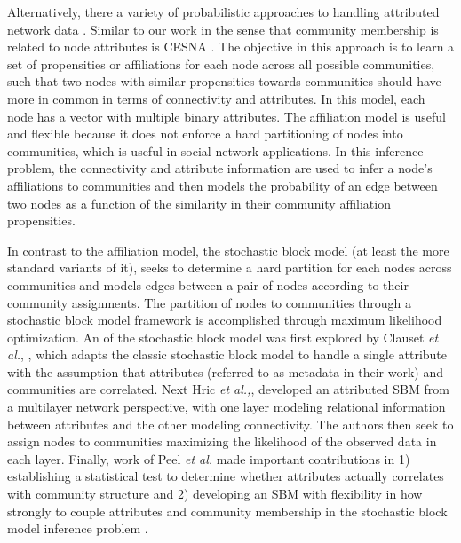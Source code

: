 Alternatively, there a variety of probabilistic approaches to handling attributed network data \cite{clauset,hric,peel2017ground,cesna}. Similar to our work in the sense that community membership is related to node attributes is CESNA \cite{cesna}. The objective in this approach is to learn a set of propensities or affiliations for each node across all possible communities, such that two nodes with similar propensities towards communities should have more in common in terms of connectivity and attributes. In this model, each node has a vector with multiple binary attributes. The affiliation model is useful and flexible because it does not enforce a hard partitioning of nodes into communities, which is useful in social network applications. In this inference problem, the connectivity and attribute information are used to infer a node's affiliations to communities and then models the probability of an edge between two nodes as a function of the similarity in their community affiliation propensities. 

In contrast to the affiliation model, the stochastic block model \cite{originalSBM} (at least the more standard variants of it), seeks to determine a hard partition for each nodes across communities and models edges between a pair of nodes according to their community assignments. The partition of nodes to communities through a stochastic block model framework is accomplished through maximum likelihood optimization. An of the stochastic block model was first explored by Clauset \emph{et al.}, \cite{clauset}, which adapts the classic stochastic block model to handle a single attribute with the assumption that attributes (referred to as metadata in their work) and communities are correlated. Next Hric \emph{et al.,}, developed an attributed SBM \cite{hric} from a multilayer network perspective, with one layer modeling relational information between attributes and the other modeling connectivity. The authors then seek to assign nodes to communities  maximizing the likelihood of the observed data in each layer. Finally, work of Peel \emph{et al.} made important contributions in 1) establishing a statistical test to determine whether attributes actually correlates with community structure and 2) developing an SBM with flexibility in how strongly to couple attributes and community membership in the stochastic block model inference problem \cite{peel2017ground}. 

